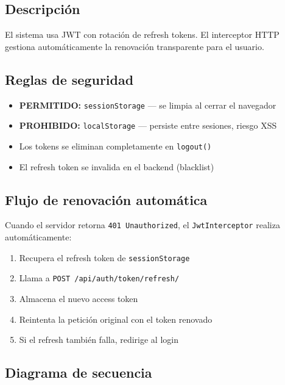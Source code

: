 \documentclass[11pt,a4paper]{article}
\begin{document}
\subsection{Descripción}

El sistema usa JWT con rotación de refresh tokens. El interceptor HTTP gestiona
automáticamente la renovación transparente para el usuario.

\subsection{Reglas de seguridad}

\begin{tcolorbox}[warnbox, title={Política de almacenamiento (OWASP)}]
\begin{itemize}[itemsep=3pt]
  \item \textbf{PERMITIDO:} \texttt{sessionStorage} — se limpia al cerrar el navegador
  \item \textbf{PROHIBIDO:} \texttt{localStorage} — persiste entre sesiones, riesgo XSS
  \item Los tokens se eliminan completamente en \texttt{logout()}
  \item El refresh token se invalida en el backend (blacklist)
\end{itemize}
\end{tcolorbox}

\subsection{Flujo de renovación automática}

Cuando el servidor retorna \texttt{401 Unauthorized}, el \texttt{JwtInterceptor} realiza
automáticamente:
\begin{enumerate}[itemsep=4pt]
  \item Recupera el refresh token de \texttt{sessionStorage}
  \item Llama a \texttt{POST /api/auth/token/refresh/}
  \item Almacena el nuevo access token
  \item Reintenta la petición original con el token renovado
  \item Si el refresh también falla, redirige al login
\end{enumerate}

\subsection{Diagrama de secuencia}
\end{document}
